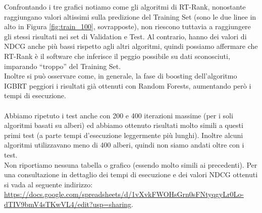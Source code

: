 	Confrontando i tre grafici notiamo come gli algoritmi di RT-Rank, nonostante raggiungano valori altissimi sulla predizione del Training Set (sono le due linee in alto in Figura \ref{fig:train_100}, sovrapposte), non riescono tuttavia a raggiungere gli stessi risultati nei set di Validation e Test. Al contrario, hanno dei valori di NDCG anche più bassi rispetto agli altri algoritmi, quindi possiamo affermare che RT-Rank è il software che inferisce il peggio possibile su dati sconosciuti, imparando ``troppo'' del Training Set.\\
	Inoltre si può osservare come, in generale, la fase di boosting dell'algoritmo IGBRT peggiori i risultati già ottenuti con Random Forests, aumentando però i tempi di esecuzione.\\
	\\
	Abbiamo ripetuto i test anche con 200 e 400 iterazioni massime (per i soli algoritmi basati su alberi) ed abbiamo ottenuto risultati molto simili a questi primi test (a parte tempi d'esecuzione leggermente più lunghi). Inoltre alcuni algoritmi utilizzavano meno di 400 alberi, quindi non siamo andati oltre con i test.\\
	Non riportiamo nessuna tabella o grafico (essendo molto simili ai precedenti). Per una consultazione in dettaglio dei tempi di esecuzione e dei valori NDCG ottenuti si vada al seguente indirizzo: \url{https://docs.google.com/spreadsheets/d/1vXvkFWOHsGrn0sFNtyqgyLr0Lo-dTIV9bmV4sTKwVL4/edit?usp=sharing}.
